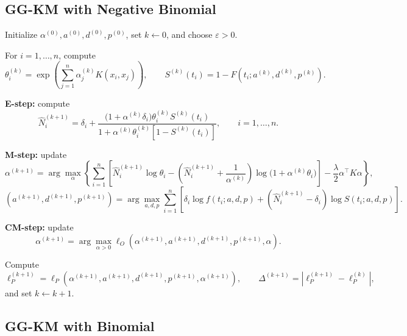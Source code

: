 \subsection{GG-KM with Negative Binomial}

\begin{algorithm}[H]
\caption{ECME algorithm for estimating the GG-KM model with
Negative Binomial latent risks.}
\begin{algorithmic}[1]

\State Initialize
$\alpha^{(0)},a^{(0)},d^{(0)},p^{(0)}$, set $k\gets0$, and choose
$\varepsilon>0$.

\Repeat

\State For $i=1,\ldots,n$, compute
\[
\theta_i^{(k)}
=
\exp\!\left(
\sum_{j=1}^{n}\alpha_j^{(k)}K(x_i,x_j)
\right),
\qquad
S^{(k)}(t_i)
=
1-F\!\left(t_i;a^{(k)},d^{(k)},p^{(k)}\right).
\]

\State \textbf{E-step:} compute
\[
\widehat N_i^{(k+1)}
=
\delta_i+
\frac{
\bigl(1+\alpha^{(k)}\delta_i\bigr)
\theta_i^{(k)}S^{(k)}(t_i)
}{
1+\alpha^{(k)}\theta_i^{(k)}
\left[1-S^{(k)}(t_i)\right]
},
\qquad i=1,\ldots,n.
\]

\State \textbf{M-step:} update
\[
\alpha^{(k+1)}
=
\arg\max_{\alpha}
\left\{
\sum_{i=1}^{n}
\left[
\widehat N_i^{(k+1)}\log\theta_i
-
\left(
\widehat N_i^{(k+1)}+\frac{1}{\alpha^{(k)}}
\right)
\log\!\bigl(1+\alpha^{(k)}\theta_i\bigr)
\right]
-\frac{\lambda}{2}\alpha^\top K\alpha
\right\},
\]
\[
(a^{(k+1)},d^{(k+1)},p^{(k+1)})
=
\arg\max_{a,d,p}
\sum_{i=1}^{n}
\left[
\delta_i\log f(t_i;a,d,p)
+
(\widehat N_i^{(k+1)}-\delta_i)
\log S(t_i;a,d,p)
\right].
\]

\State \textbf{CM-step:} update
\[
\alpha^{(k+1)}
=
\arg\max_{\alpha>0}
\ell_O\!\left(
\alpha^{(k+1)},a^{(k+1)},d^{(k+1)},p^{(k+1)},\alpha
\right).
\]

\State Compute
\[
\ell_P^{(k+1)}
=
\ell_P\!\left(
\alpha^{(k+1)},a^{(k+1)},d^{(k+1)},p^{(k+1)},\alpha^{(k+1)}
\right),
\qquad
\Delta^{(k+1)}
=
\left|\ell_P^{(k+1)}-\ell_P^{(k)}\right|,
\]
and set $k\gets k+1$.


\end{algorithmic}
\end{algorithm}

\subsection{GG-KM with Binomial}

